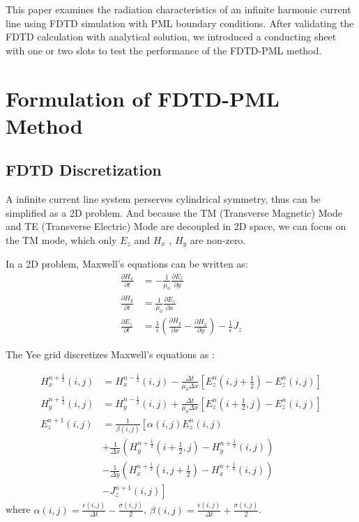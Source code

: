 \documentclass[journal]{IEEEtran}
\begin{document}
This paper examines the radiation characteristics of an infinite harmonic current line using FDTD simulation with PML boundary conditions. 
After validating the FDTD calculation with analytical solution, we introduced a conducting sheet with one or two slots to test the performance of the FDTD-PML method.

\section{Formulation of FDTD-PML Method}
\subsection{FDTD Discretization}
A infinite current line system perserves cylindrical symmetry, thus can be simplified as a 2D problem.
And because the TM (Transverse Magnetic) Mode and TE (Transverse Electric) Mode are decoupled in 2D space, we can focus on the TM mode, 
which only $E_z$ and $H_x$ , $H_y$ are non-zero. 

In a 2D problem, Maxwell's equations can be written as:
\begin{align}
\frac{\partial H_x}{\partial t} &= -\frac{1}{\mu_0}\frac{\partial E_z}{\partial y} \\
\frac{\partial H_y}{\partial t} &= \frac{1}{\mu_0}\frac{\partial E_z}{\partial x} \\
\frac{\partial E_z}{\partial t} &= \frac{1}{\epsilon}\left(\frac{\partial H_y}{\partial x} - \frac{\partial H_x}{\partial y}\right) - \frac{1}{\epsilon} J_z
\end{align}

The Yee grid discretizes Maxwell's equations as \cite{jin2015theory}:

\begin{align}
H_x^{n+\frac{1}{2}}(i,j) &= H_x^{n-\frac{1}{2}}(i,j) - \frac{\Delta t}{\mu_0\Delta x}\left[E_z^n(i,j+\frac{1}{2}) - E_z^n(i,j)\right] \\
H_y^{n+\frac{1}{2}}(i,j) &= H_y^{n-\frac{1}{2}}(i,j) + \frac{\Delta t}{\mu_0\Delta x}\left[E_z^n(i+\frac{1}{2},j) - E_z^n(i,j)\right] \\  
E_z^{n+1}(i,j) &= \frac{1}{\beta(i,j)}\left[\alpha(i,j) E_z^n(i,j) \right. \nonumber \\
&+ \frac{1}{\Delta x}\left(H_y^{n+\frac{1}{2}}(i+\frac{1}{2},j) - H_y^{n+\frac{1}{2}}(i,j)\right) \nonumber \\
&- \frac{1}{\Delta y}\left(H_x^{n+\frac{1}{2}}(i,j+\frac{1}{2}) - H_x^{n+\frac{1}{2}}(i,j)\right) \nonumber \\
&\left. - J_z^{n+1}(i,j)\right]
\end{align}
where $\alpha(i,j)=\frac{\epsilon(i,j)}{\Delta t}-\frac{\sigma(i,j)}{2}$, $\beta(i,j)=\frac{\epsilon(i,j)}{\Delta t}+\frac{\sigma(i,j)}{2}$.
\end{document}
